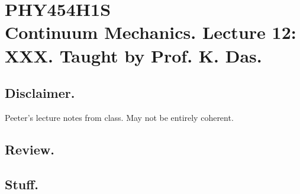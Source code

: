 
%

\chapter{PHY454H1S\\Continuum Mechanics.  Lecture 12: XXX.  Taught by Prof. K. Das.}
\label{chap:continuumL12}
{}
\date{Feb 12, 2012}

\beginArtWithToc

\section{Disclaimer.}

Peeter's lecture notes from class.  May not be entirely coherent.

\section{Review.}

\section{Stuff.}


\EndArticle
